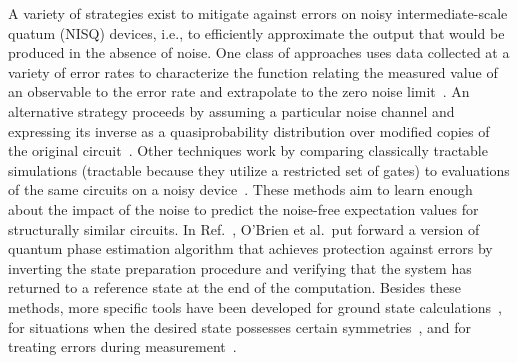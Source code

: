 \documentclass[
amsmath,
amssymb,
aps,
pra,
reprint,
twocolumn,
superscriptaddress,
longbibliography,
showkeys,
floatfix
]{revtex4-1}
\begin{document}
A variety of strategies exist to mitigate against errors on noisy
intermediate-scale quatum (NISQ) devices, i.e., to efficiently approximate the
output that would be produced in the absence of noise.
One class of approaches uses data collected at a variety of error rates to
characterize the function relating the measured value of an observable to the
error rate and extrapolate to the zero noise limit~\cite{Temme2017-hj,
  Endo2018-qs, Kandala2019-gy}. 
An alternative strategy proceeds by assuming a particular noise channel and
expressing its inverse as a quasiprobability distribution over modified copies
of the original circuit~\cite{Temme2017-hj}.
Other techniques work by comparing classically tractable simulations (tractable
because they utilize a restricted set of gates) to evaluations of the same
circuits on a noisy device~\cite{Strikis2020-ve, Czarnik2020-pb, Arute2020-ta}.
These methods aim to learn enough about the impact of the noise to predict the
noise-free expectation values for structurally similar circuits.
In Ref.~, O'Brien et al.~put forward a version of quantum
phase estimation algorithm that achieves protection against errors by inverting
the state preparation procedure and verifying that the system has returned to a
reference state at the end of the computation.
Besides these methods, more specific tools have been developed for ground state
calculations~\cite{McClean2017-ta, Colless2018-af, McClean2020-pq}, for
situations when the desired state possesses certain
symmetries~\cite{Bonet-Monroig2018-od, McArdle2019-uv, Sagastizabal2019-sz,
  Huggins2019-vu, Google_AI_Quantum_and_Collaborators2020-sc}, and for treating
errors during measurement~\cite{Chen2019-sg, Maciejewski2020-ju, Bravyi2020-dn}.
\end{document}
